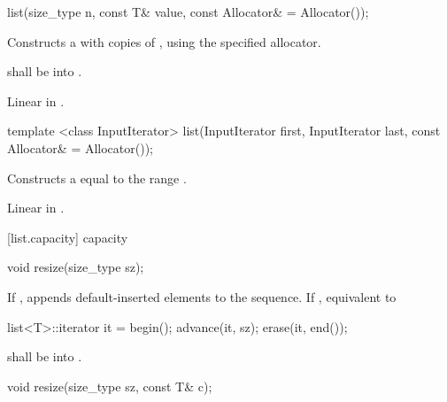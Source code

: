 %
%
\begin{itemdecl}
list(size_type n, const T& value,
     const Allocator& = Allocator());
\end{itemdecl}

\begin{itemdescr}
\pnum
\effects
Constructs a
with
copies of
,
using the specified allocator.

\pnum
\requires {} shall be  into .

\pnum
\complexity
Linear in
.
\end{itemdescr}

%
%
\begin{itemdecl}
template <class InputIterator>
list(InputIterator first, InputIterator last,
     const Allocator& = Allocator());
\end{itemdecl}

\begin{itemdescr}
\pnum
\effects
Constructs a
equal to the range
.

\pnum
\complexity
Linear in
.
\end{itemdescr}

[list.capacity]{ capacity}

%
\begin{itemdecl}
void resize(size_type sz);
\end{itemdecl}

\begin{itemdescr}
\pnum
\effects
If ,
appends  default-inserted elements to the
sequence.
If , equivalent to

\begin{codeblock}
list<T>::iterator it = begin();
advance(it, sz);
erase(it, end());
\end{codeblock}


\pnum
\requires {} shall be
 into .
\end{itemdescr}

%
\begin{itemdecl}
void resize(size_type sz, const T& c);
\end{itemdecl}

